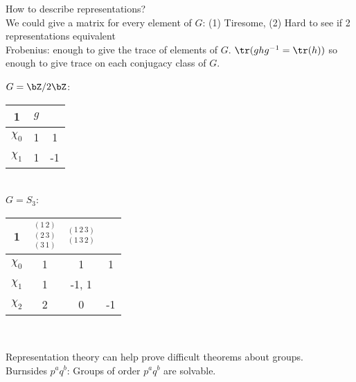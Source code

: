 \noindent
How to describe representations? \\
We could give a matrix for every element of $G$: (1) Tiresome, (2) Hard to see if 2 representations equivalent \\
Frobenius: enough to give the trace of elements of $G$. $\tr(ghg^{-1} = \tr(h))$ so enough to give trace on each conjugacy class of $G$. 

\begin{example}
    $G=\bZ/2\bZ$: \begin{tabular}{c | c c|} 1 & $g$ \\ \hline $\chi_0$ & 1 & 1 \\ $\chi_1$ & 1 & -1 \end{tabular} \\
    $G=S_3$:  \begin{tabular}{c | c c c|} 1 & $\stackrel{(1 \, 2)}{\stackrel{(2 \, 3)}{\stackrel{(3 \, 1)}{}}}$ & $\stackrel{(1 \, 2 \, 3)}{\stackrel{(1 \, 3 \, 2)}{}}$ \\ \hline $\chi_0$ & 1 & 1 & 1 \\ $\chi_1$ & 1 & -1, 1 \\ $\chi_2$ & 2 & 0 & -1 \end{tabular} \\
\end{example}

\noindent
Representation theory can help prove difficult theorems about groups. \\
Burnsides $p^aq^b$: Groups of order $p^aq^b$ are solvable. 